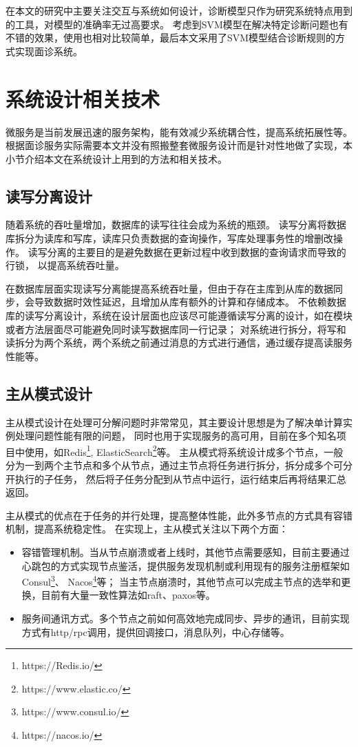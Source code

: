 在本文的研究中主要关注交互与系统如何设计，诊断模型只作为研究系统特点用到的工具，对模型的准确率无过高要求。
考虑到SVM模型在解决特定诊断问题也有不错的效果，使用也相对比较简单，最后本文采用了SVM模型结合诊断规则的方式实现面诊系统。

\section{系统设计相关技术}
微服务是当前发展迅速的服务架构\cite{jamshidi2018microservices}，能有效减少系统耦合性，提高系统拓展性等。
根据面诊服务实际需要本文并没有照搬整套微服务设计而是针对性地做了实现，本小节介绍本文在系统设计上用到的方法和相关技术。

\subsection{读写分离设计}
随着系统的吞吐量增加，数据库的读写往往会成为系统的瓶颈。
读写分离将数据库拆分为读库和写库，读库只负责数据的查询操作，写库处理事务性的增删改操作。
读写分离的主要目的是避免数据在更新过程中收到数据的查询请求而导致的行锁，
以提高系统吞吐量。

在数据库层面实现读写分离能提高系统吞吐量，但由于存在主库到从库的数据同步，会导致数据时效性延迟，且增加从库有额外的计算和存储成本。
不依赖数据库的读写分离设计，系统在设计层面也应该尽可能遵循读写分离的设计，如在模块或者方法层面尽可能避免同时读写数据库同一行记录；
对系统进行拆分，将写和读拆分为两个系统，两个系统之前通过消息的方式进行通信，通过缓存提高读服务性能等。

\subsection{主从模式设计}
主从模式设计在处理可分解问题时非常常见，其主要设计思想是为了解决单计算实例处理问题性能有限的问题，
同时也用于实现服务的高可用，目前在多个知名项目中使用，如Redis\footnote{https://Redis.io/}, ElasticSearch\footnote{https://www.elastic.co/}等。
主从模式将系统设计成多个节点，一般分为一到两个主节点和多个从节点，通过主节点将任务进行拆分，拆分成多个可分开执行的子任务，
然后将子任务分配到从节点中运行，运行结束后再将结果汇总返回。

主从模式的优点在于任务的并行处理，提高整体性能，此外多节点的方式具有容错机制，提高系统稳定性。
在实现上，主从模式关注以下两个方面：
\begin{itemize}
    \item 容错管理机制。当从节点崩溃或者上线时，其他节点需要感知，目前主要通过心跳包的方式实现节点鉴活，提供服务发现机制或利用现有的服务注册框架如Consul\footnote{https://www.consul.io/}、 Nacos\footnote{https://nacos.io/}等；
    当主节点崩溃时，其他节点可以完成主节点的选举和更换，目前有大量一致性算法如raft、paxos等。
    \item 服务间通讯方式。多个节点之前如何高效地完成同步、异步的通讯，目前实现方式有http/rpc调用，提供回调接口，消息队列，中心存储等。
\end{itemize}

